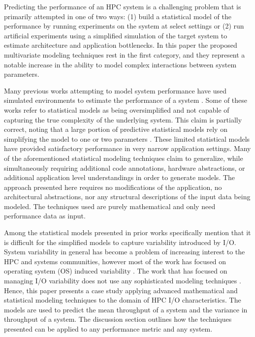 \documentclass{scspaperproc}
\theoremstyle{scsthe}
\begin{document}
Predicting the performance of an HPC system is a challenging problem
that is primarily attempted in one of two ways: (1) build a
statistical model of the performance by running experiments on the
system at select settings or (2) run artificial experiments using a
simplified simulation of the target system to estimate architecture
and application bottlenecks. In this paper the proposed multivariate
modeling techniques rest in the first category, and they represent a
notable increase in the ability to model complex interactions between
system parameters.

Many previous works attempting to model system performance have used
simulated environments to estimate the performance of a system
. Some
of these works refer to statistical models as being oversimplified and
not capable of capturing the true complexity of the underlying
system. This claim is partially correct, noting that a large portion
of predictive statistical models rely on simplifying the model to one
or two parameters
.
These limited statistical models have provided satisfactory
performance in very narrow application settings. Many of the
aforementioned statistical modeling techniques claim to generalize,
while simultaneously requiring additional code annotations, hardware
abstractions, or additional application level understandings in order
to generate models. The approach presented here requires no
modifications of the application, no architectural abstractions, nor
any structural descriptions of the input data being modeled. The
techniques used are purely mathematical and only need performance data
as input.

Among the statistical models presented in prior works
 specifically mention that it is
difficult for the simplified models to capture variability introduced
by I/O. System variability in general has become a problem of
increasing interest to the HPC and systems communities, however most
of the work has focused on operating system (OS) induced variability
. The work that
has focused on managing I/O variability does not use any sophisticated
modeling techniques . Hence, this
paper presents a case study applying advanced mathematical and
statistical modeling techniques to the domain of HPC I/O
characteristics. The models are used to predict the mean throughput of
a system and the variance in throughput of a system. The discussion
section outlines how the techniques presented can be applied to any
performance metric and any system.
\end{document}
